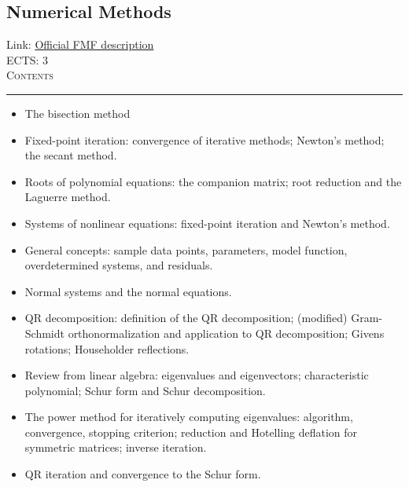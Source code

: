 \documentclass[11pt, a4paper]{article}
\newenvironment{course}[3]{
\subsection{#1}%
Link: \href{#2}{Official FMF description}\\%
ECTS: #3%
\vspace{1ex}
\\
{\large \textsc{Contents}}\\[-0.9ex]%
\rule{\textwidth}{0.5pt}
\vspace{-3ex}
}
{}
\newenvironment{chapter}[1]{
\begin{tcolorbox}[title=#1, breakable]
}
{\end{tcolorbox}}
\begin{document}
\begin{course}{Numerical Methods}{https://www.fmf.uni-lj.si/en/study-physics/programmes/1fiz/2020/7000777/courses/524/}{3}
\begin{chapter}{Nonlinear equations}
\begin{itemize}
            \item The bisection method

            \item Fixed-point iteration: convergence of iterative methods; Newton's method; the secant method.

            \item Roots of polynomial equations: the companion matrix; root reduction and the Laguerre method.

            \item Systems of nonlinear equations: fixed-point iteration and Newton's method.
        
        \end{itemize}
    \end{chapter}

    \begin{chapter}{Linear least square problems}
        \begin{itemize}
        
            \item General concepts: sample data points, parameters, model function, overdetermined systems, and residuals.

            \item Normal systems and the normal equations.

            \item QR decomposition: definition of the QR decomposition; (modified) Gram-Schmidt orthonormalization and application to QR decomposition; Givens rotations; Householder reflections.
        
        \end{itemize}
    \end{chapter}

    \begin{chapter}{The eigenvalue problem}
        \begin{itemize}
        
            \item Review from linear algebra: eigenvalues and eigenvectors; characteristic polynomial; Schur form and Schur decomposition.

            \item The power method for iteratively computing eigenvalues: algorithm, convergence, stopping criterion; reduction and Hotelling deflation for symmetric matrices; inverse iteration.

            \item QR iteration and convergence to the Schur form.


\end{itemize}
\end{chapter}
\end{course}
\end{document}
